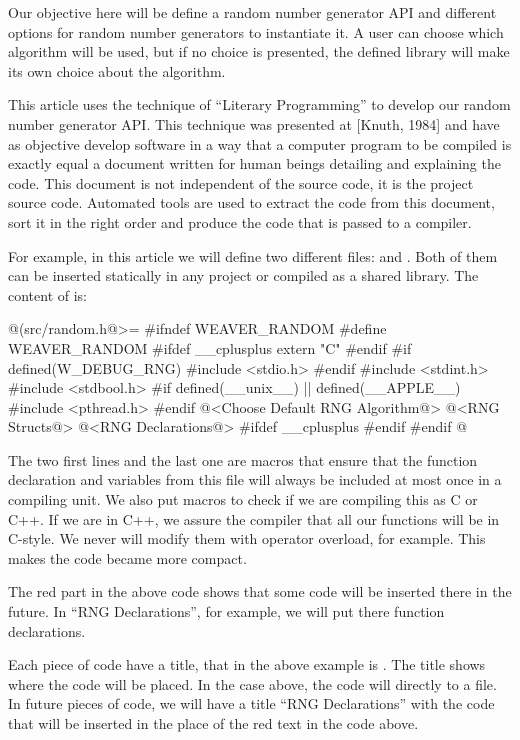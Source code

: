 Our objective here will be define a random number generator API and
different options for random number generators to instantiate it. A
user can choose which algorithm will be used, but if no choice is
presented, the defined library will make its own choice about the
algorithm.


This article uses the technique of ``Literary Programming'' to develop
our random number generator API. This technique was presented at
[Knuth, 1984] and have as objective develop software in a way that a
computer program to be compiled is exactly equal a document written
for human beings detailing and explaining the code. This document is
not independent of the source code, it is the project source
code. Automated tools are used to extract the code from this document,
sort it in the right order and produce the code that is passed to a
compiler.

For example, in this article we will define two different
files:  and . Both of them
can be inserted statically in any project or compiled as a shared
library. The content of  is:

\iniciocodigo
@(src/random.h@>=
#ifndef WEAVER_RANDOM
#define WEAVER_RANDOM
#ifdef __cplusplus
extern "C" {
#endif
#if defined(W_DEBUG_RNG)
#include <stdio.h>
#endif
#include <stdint.h>
#include <stdbool.h>
#if defined(__unix__) || defined(__APPLE__)
#include <pthread.h>
#endif
@<Choose Default RNG Algorithm@>
@<RNG Structs@>
@<RNG Declarations@>
#ifdef __cplusplus
}
#endif
#endif
@
\fimcodigo

The two first lines and the last one are macros that ensure that the
function declaration and variables from this file will always be
included at most once in a compiling unit. We also put macros to check
if we are compiling this as C or C++. If we are in C++, we assure the
compiler that all our functions will be in C-style. We never will
modify them with operator overload, for example. This makes the code
became more compact.

The red part in the above code shows that some code will be inserted
there in the future. In ``RNG Declarations'', for example, we will put
there function declarations.

Each piece of code have a title, that in the above example is
. The title shows where the code will be placed.
In the case above, the code will directly to a file. In future pieces
of code, we will have a title ``RNG Declarations'' with the code that
will be inserted in the place of the red text in the code above.

